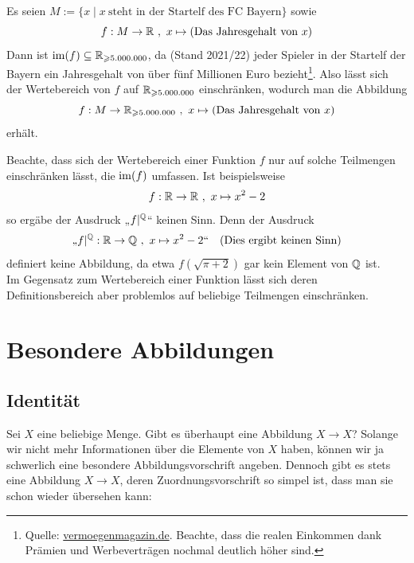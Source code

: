 \begin{bsp}
Es seien $M := \{ x\mid x\ \text{steht in der Startelf des FC Bayern} \}$ sowie
\[ f : M \to {\mathbb R} \ ,\ x \mapsto (\text{Das Jahresgehalt von $x$}) \]
Dann ist $\operatorname{im}(f)\subseteq {\mathbb R}_{\geqslant 5.000.000}$, da (Stand 2021/22) jeder Spieler in der Startelf der Bayern ein Jahresgehalt von über fünf Millionen Euro bezieht\footnote{Quelle: \href{https://www.vermoegenmagazin.de/bayern-muenchen-gehaelter/}{vermoegenmagazin.de}. Beachte, dass die realen Einkommen dank Prämien und Werbeverträgen nochmal deutlich höher sind.}. Also lässt sich der Wertebereich von $f$ auf ${\mathbb R}_{\geqslant 5.000.000}$ einschränken, wodurch man die Abbildung
\[ f : M \to {\mathbb R}_{\geqslant 5.000.000} \ ,\ x \mapsto (\text{Das Jahresgehalt von $x$}) \]
erhält.
\end{bsp}



\begin{bem}
 Beachte, dass sich der Wertebereich einer Funktion $f$ nur auf solche Teilmengen einschränken lässt, die $\operatorname{im}(f)$ umfassen. Ist beispielsweise
  \[ f : {\mathbb R} \to {\mathbb R} \ ,\ x \mapsto x^2-2 \]
so ergäbe der Ausdruck „$f\vert^{{\mathbb Q}}$“ keinen Sinn. Denn der Ausdruck
\begin{align*}
 \text{„$f\vert^{{\mathbb Q}} : {\mathbb R} \to {\mathbb Q} \ ,\ x\mapsto x^2-2$“} && (\text{Dies ergibt keinen Sinn})
\end{align*}
definiert keine Abbildung, da etwa $f(\sqrt{\pi + 2})$ gar kein Element von ${\mathbb Q}$ ist. \\[0.5em]
Im Gegensatz zum Wertebereich einer Funktion lässt sich deren Definitionsbereich aber problemlos auf beliebige Teilmengen einschränken.
\end{bem}







\section{Besondere Abbildungen}




\subsection{Identität}
Sei $X$ eine beliebige Menge. Gibt es überhaupt eine Abbildung $X\to X$? Solange wir nicht mehr Informationen über die Elemente von $X$ haben, können wir ja schwerlich eine besondere Abbildungsvorschrift angeben. Dennoch gibt es stets eine Abbildung $X\to X$, deren Zuordnungsvorschrift so simpel ist, dass man sie schon wieder übersehen kann:

